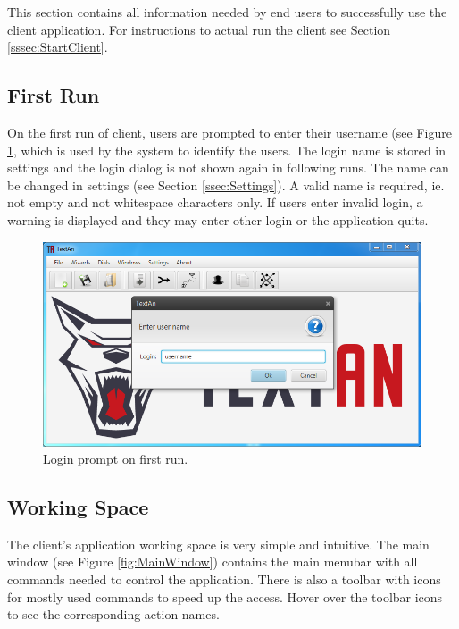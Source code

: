 This section contains all information needed by end users to successfully use
the \textan{} client application. For instructions to actual run the client
see Section \ref{sssec:StartClient}. 

\subsection{First Run}

On the first run of \textan{} client, users are prompted to enter their username
(see Figure \ref{fig:Login}, which is used by the system to identify the users.
The login name is stored in settings and the login dialog is not shown again
in following runs. The name can be changed in settings (see Section
\ref{ssec:Settings}). A valid name is required, ie. not empty and not whitespace
characters only. If users enter invalid login, a warning is displayed and they
may enter other login or the application quits.

\begin{figure}[!htb]
        \centering
        \includegraphics[width=\textwidth]{Images/login}
        \caption{Login prompt on first run.}
        \label{fig:Login}
\end{figure}

\subsection{Working Space}

The \textan{} client's application working space is very simple and intuitive.
The main window (see Figure \ref{fig:MainWindow}) contains the main menubar with
all commands needed to control the application. There is also a toolbar with
icons for mostly used commands to speed up the access. Hover over the
toolbar icons to see the corresponding action names.

